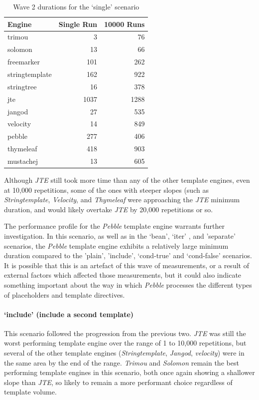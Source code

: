 \begin{table}[ht!]
\centering
\begin{tabular}{lrr}
\textbf{Engine} & \textbf{Single Run} & \textbf{10000 Runs} \\
\hline
trimou & 3 & 76 \\
solomon & 13 & 66 \\
freemarker & 101 & 262 \\
stringtemplate & 162 & 922 \\
stringtree & 16 & 378 \\
jte & 1037 & 1288 \\
jangod & 27 & 535 \\
velocity & 14 & 849 \\
pebble & 277 & 406 \\
thymeleaf & 418 & 903 \\
mustachej & 13 & 605 \\
\end{tabular}
\caption{Wave 2 durations for the `single' scenario\label{w2:results:single}}
\end{table}

Although \emph{JTE} still took more time than any of the other template engines, even at 10,000 repetitions, some of the ones with steeper slopes (such as \emph{Stringtemplate}, \emph{Velocity}, and \emph{Thymeleaf} were approaching the \emph{JTE} minimum duration, and would likely overtake \emph{JTE} by 20,000 repetitions or so.

The performance profile for the \emph{Pebble} template engine warrants further investigation. In this scenario, as well as in the `bean', `iter' , and 'separate' scenarios, the \emph{Pebble} template engine exhibits a relatively large minimum duration compared to the 'plain', 'include', `cond-true' and `cond-false' scenarios. It is possible that this is an artefact of this wave of measurements, or a result of external factors which affected those measurements, but it could also indicate something important about the way in which \emph{Pebble} processes the different types of placeholders and template directives.

\paragraph{`include' (include a second template)}

This scenario followed the progression from the previous two. \emph{JTE} was still the worst performing template engine over the range of 1 to 10,000 repetitions, but several of the other template engines (\emph{Stringtemplate}, \emph{Jangod}, \emph{velocity}) were in the same area by the end of the range. \emph{Trimou} and \emph{Solomon} remain the best performing template engines in this scenario, both once again showing a shallower slope than \emph{JTE}, so likely to remain a more performant choice regardless of template volume.

